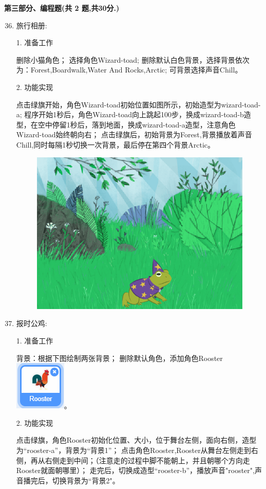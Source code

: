 \documentclass[10pt, a4paper]{article}
\begin{document}
    \newpage
    {\noindent \textbf{第三部分、编程题(共 2 题,共30分.)}}
    \begin{enumerate}
        \setcounter{enumi}{35}
        
        \item 旅行相册:
        
        1. 准备工作
        \begin{tasks}[label = (\arabic*)]
            \task 删除小猫角色；
            \task 选择角色Wizard-toad;
            \task 删除默认白色背景，选择背景依次为：Forest,Boardwalk,Water And Rocks,Arctic;
            \task 可背景选择声音Chill。
        \end{tasks}
        2. 功能实现
        \begin{tasks}[label = (\arabic*)]
            \task 点击绿旗开始，角色Wizard-toad初始位置如图所示，初始造型为wizard-toad-a;
            \task 程序开始1秒后，角色Wizard-toad向上跳起100步，换成wizard-toad-b造型，在空中停留1秒后，落到地面，换成wizard-toad-a造型，注意角色
            Wizard-toad始终朝向右；
            \task 点击绿旗后，初始背景为Forest,背景播放着声音Chill,同时每隔1秒切换一次背景，最后停在第四个背景Arctic。
        \end{tasks}
        \begin{figure}[htbp]
            \centering
            \includegraphics[width=.26\textwidth]{36.png}
        \end{figure}

        \item 报时公鸡:
        
        1. 准备工作
        \begin{tasks}[label = (\arabic*)]
            \task 背景：根据下图绘制两张背景；
            \task 删除默认角色，添加角色Rooster\includegraphics[width=.05\textwidth]{37-2.png}。
        \end{tasks}
        2. 功能实现
        \begin{tasks}[label = (\arabic*)]
            \task 点击绿旗，角色Rooster初始化位置、大小，位于舞台左侧，面向右侧，造型为“rooster-a”，背景为“背景1”；
            \task 点击角色Rooster,Rooster从舞台左侧走到右侧，再从右侧走到中间；（注意走的过程中脚不能朝上，并且朝哪个方向走Rooster就面朝哪里）；
            \task 走完后，切换成造型“rooster-b”，播放声音"rooster",声音播完后，切换背景为“背景2"。
        \end{tasks}


\end{enumerate}
\end{document}
